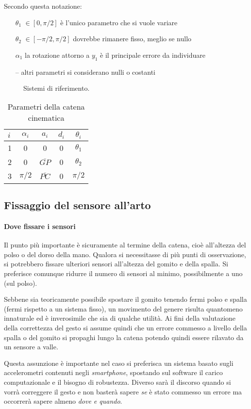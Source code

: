 Secondo questa notazione:
\begin{itemize}
	\item [$\theta_{1}$] {$\in [0, \pi/2]$ \`e l'unico parametro che si vuole variare}
	\item [$\theta_{2}$] {$\in [-\pi/2, \pi/2]$ dovrebbe rimanere fisso, meglio se nullo}
	\item [$\alpha_{1}$] la rotazione attorno a $y_{1}$ \`e il principale errore da individuare
	\item [--] {altri parametri si considerano nulli o costanti}
\end{itemize}

\begin{figure}
  \centering
    
  \caption{Sistemi di riferimento.}
  \label{fig:gomito1}
\end{figure}

\begin{table}
\centering
\caption{Parametri della catena cinematica}
\label{tab:robo}
\begin{tabular} {l c c c c}
	\hline
	$i$ & $\alpha_{i}$ & $a_{i}$ & $d_{i}$ & $\theta_{i}$\\
	\hline
	1 & 0 & 0 & 0 & $\theta_{1}$ \\
	2 & 0 & $\bar{GP}$ & 0 & $\theta_{2}$ \\
	3 & $\pi/2$ & $\bar{PC}$ & 0 & $\pi/2$ \\
	\hline
\end{tabular}
\end{table}





\subsection{Fissaggio del sensore all'arto}
\label{ssez:fissaggio}

\paragraph{Dove fissare i sensori}
Il punto più importante è sicuramente al termine della catena,
cioè all'altezza del polso o del dorso della mano.
Qualora si necessitasse di più punti di osservazione,
si potrebbero fissare ulteriori sensori all'altezza del gomito e della spalla.
Si preferisce comunque ridurre il numero di sensori al minimo,
possibilmente a uno (sul polso).

Sebbene sia teoricamente possibile spostare il gomito
tenendo fermi polso e spalla (fermi rispetto a un sistema fisso),
un movimento del genere risulta quantomeno innaturale
ed è inverosimile che sia di qualche utilità.
Ai fini della valutazione della correttezza del gesto
si assume quindi che un errore commesso a livello della spalla
o del gomito si propaghi lungo la catena
potendo quindi essere rilavato da un sensore a valle.

Questa assunzione è importante nel caso si preferisca
un sistema basato sugli accelerometri contenuti negli \textit{smartphone},
spostando sul software il carico computazionale
e il bisogno di robustezza.
Diverso sarà il discorso quando si vorrà correggere il gesto
e non basterà sapere \emph{se} è stato commesso un errore
ma occorrerà sapere almeno \emph{dove e quando}.
